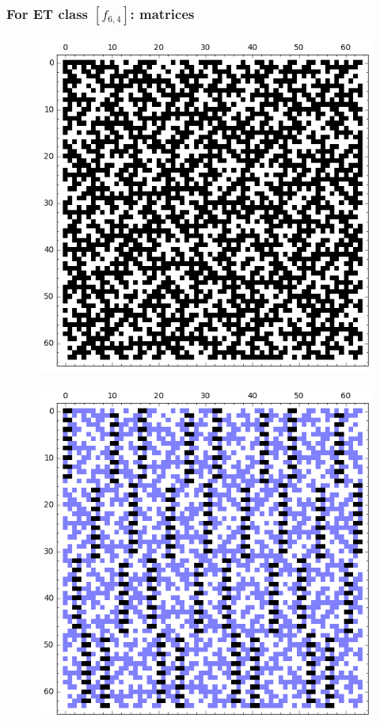 \documentclass[pdf,sprung,slideColor,nocolorBG]{beamer}
\begin{document}
\begin{frame}
\frametitle{For ET class $[f_{6,4}]$: matrices}
\begin{figure}
\centering
\begin{minipage}{.48\textwidth}
  \centering
  \includegraphics[width=.9\linewidth]{../matrix_plot/c6_4_weight_class_matrix.png}
  \label{fig:6_4_weight_class_matrix}
\end{minipage}%
\begin{minipage}{.48\textwidth}
  \centering
  \includegraphics[width=.9\linewidth]{../matrix_plot/c6_4_bent_cayley_graph_index_matrix.png}
  \label{fig:6_4_bent_cayley_graph_index_matrix}
\end{minipage}
\end{figure}
\end{frame}
\end{document}
